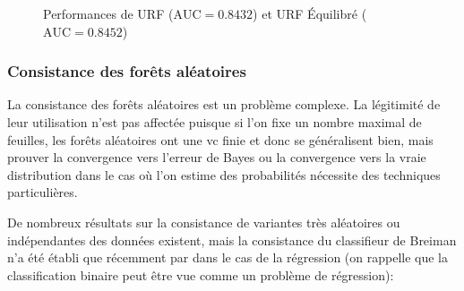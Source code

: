 \begin{figure}[htbp]
    \caption{Performances de URF ($\mathrm{AUC} = 0.8432$) et URF Équilibré ($\mathrm{AUC} = 0.8452$)}
\end{figure}

\subsubsection{Consistance des forêts aléatoires}

La consistance des forêts aléatoires est un problème complexe. La légitimité de leur utilisation n'est pas affectée puisque si l'on fixe un nombre maximal de feuilles, les forêts aléatoires ont une \ac{vc} finie et donc se généralisent bien, mais prouver la convergence vers l'erreur de Bayes ou la convergence vers la vraie distribution dans le cas où l'on estime des probabilités nécessite des techniques particulières.

De nombreux résultats sur la consistance de variantes très aléatoires ou indépendantes des données existent, mais la consistance du classifieur de Breiman n'a été établi que récemment par \citet{Scornet2014a} dans le cas de la régression (on rappelle que la classification binaire peut être vue comme un problème de régression):

